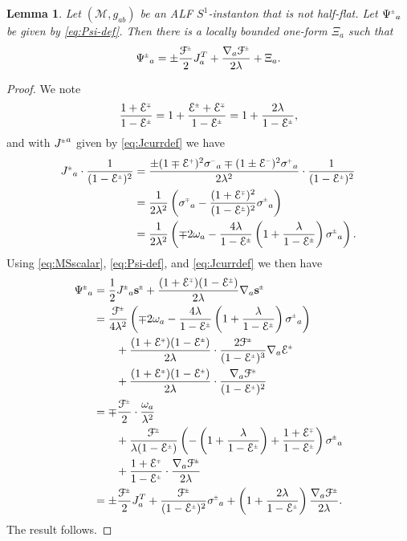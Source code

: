 \documentclass[a4paper,10pt,reqno]{amsart}
\newcommand{\cM}{\mathcal{M}}
\theoremstyle{plain}
\newtheorem{lemma}[thm]{Lemma}
\renewcommand{\P}[1]{{{#1}^{\hspace{-.5pt}\scaleto{+}{4pt}}}}
\newcommand{\M}[1]{{{#1}^{\hspace{-.5pt}\scaleto{-}{4pt}}}}
\newcommand{\PM}[1]{{{#1}^{\hspace{-.5pt}\scaleto{\pm}{3.5pt}}}}
\newcommand{\MP}[1]{{{#1}^{\hspace{-.5pt}\scaleto{\mp}{3.5pt}}}}
\def\Fcal{\mathcal{F}}
\def\Ecal{\mathcal{E}}
\def\sbold{\mathbf{s}}
\numberwithin{equation}{section}
\begin{document}
\begin{lemma} \label{lem:rewrite} 
Let $(\cM, g_{ab})$ be an ALF $S^1$-instanton that is not half-flat. Let $\PM{\Psi}_a$ be given by \eqref{eq:Psi-def}. Then there is a locally bounded one-form $\Xi_a$ such that  
\begin{align}
\PM{\Psi}_a 
= \pm \frac{\PM{\Fcal}}{2} J^T_a 
+ \frac{\nabla_a\PM{\Fcal}}{2\lambda} + \Xi_a .
\end{align} 
\end{lemma} 
\begin{proof}
We note 
\begin{align}
\frac{1 + \MP{\Ecal}}{1 - \PM{\Ecal}}
= 1 + \frac{\PM{\Ecal} + \MP{\Ecal}}{1 - \PM{\Ecal}} 
= 1 + \frac{2\lambda}{1 - \PM{\Ecal}}, 
\end{align}
and with $\PM{J}^a$ given by \eqref{eq:Jcurrdef} we have
\begin{align}
\PM{J}_{a} \cdot \frac{1}{(1 - \PM{\Ecal})^2}
&= 
\frac{\pm(1 \mp \P{\Ecal})^2 \M{\sigma}_{a} \mp (1 \pm \M{\Ecal})^2 \P{\sigma}_{a}}{2 \lambda^2} 
\cdot \frac{1}{(1 - \PM{\Ecal})^2}  \nonumber \\
&= 
\frac{1}{2 \lambda^2} \left(
\MP{\sigma}_{a} - \frac{(1 + \MP{\Ecal})^2}{(1 - \PM{\Ecal})^2} \PM{\sigma}_{a} 
\right)  \nonumber \\
&=
\frac{1}{2 \lambda^2} \left(
\mp 2\omega_a - \frac{4\lambda}{1 - \PM{\Ecal}} 
\left( 1 + \frac{\lambda}{1 - \PM{\Ecal}} \right)  \PM{\sigma}_{a}
\right).
\end{align}
Using \eqref{eq:MSscalar}, \eqref{eq:Psi-def}, and \eqref{eq:Jcurrdef} we then have
\begin{align}
\PM{\Psi}_a
&= 
\frac{1}{2} \PM{J}_a \PM{\sbold}
+ \frac{(1 + \MP{\Ecal}) (1 -  \PM{\Ecal})}{2\lambda} \nabla_a \PM{\sbold} \nonumber \\
&=
\frac{\PM{\Fcal}}{4 \lambda^2} \left(
\mp 2\omega_a 
- \frac{4\lambda}{1 - \PM{\Ecal}} \left( 1 + \frac{\lambda}{1 - \PM{\Ecal}} \right) \PM{\sigma}_{a}
\right) \nonumber \\
&\qquad 
+ \frac{(1+\MP{\Ecal}) (1-\PM{\Ecal})}{2\lambda} \cdot \frac{2\PM{\Fcal}}{(1-\PM{\Ecal})^3} \nabla_a \PM{\Ecal} \nonumber \\
&\qquad 
+ \frac{(1+\MP{\Ecal}) (1-\PM{\Ecal})}{2\lambda} \cdot \frac{\nabla_a \PM{\Fcal}}{(1 -  \PM{\Ecal})^2} \nonumber \\
&= 
\mp\frac{\PM{\Fcal}}{2} \cdot \frac{\omega_a}{\lambda^2} \nonumber \\
&\qquad
+\frac{\PM{\Fcal}}{\lambda(1-\PM{\Ecal})} 
\left(
- \left( 1 + \frac{\lambda}{1 - \PM{\Ecal}} \right) 
+ \frac{1 + \MP{\Ecal}}{1-\PM{\Ecal}} 
\right) \PM{\sigma}_{a} \nonumber \\
&\qquad 
+ \frac{1 + \MP{\Ecal}}{1 -  \PM{\Ecal}} \cdot \frac{\nabla_a\PM{\Fcal}}{2\lambda} \nonumber \\
&= 
\pm\frac{\PM{\Fcal}}{2} J^T_a 
+ \frac{\PM{\Fcal}}{(1-\PM{\Ecal})^2} \PM{\sigma}_{a} 
+ \left( 1 + \frac{2\lambda}{1 - \PM{\Ecal}}\right) \frac{\nabla_a\PM{\Fcal}}{2\lambda}. 
\end{align}
The result follows. 
\end{proof} 
\end{document}
